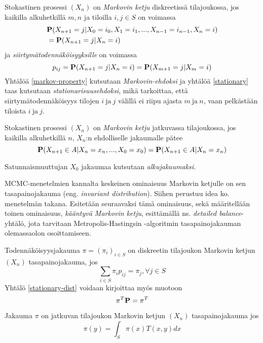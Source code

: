 \begin{maar}\label{markovin-ehto-d}
	Stokastinen prosessi $(X_n)$ on \textit{Markovin ketju} diskreetissä tilajoukossa, jos kaikilla alkuhetkillä $m,n$ ja tiloilla $i,j\in S$ on voimassa
	\begin{equation}\label{markov-property}
		\begin{split}
			&\textbf{P}(X_{n+1}=j|X_0=i_0,X_1=i_1,...,X_{n-1}=i_{n-1},X_n=i) \\
		 &= \textbf{P}(X_{n+1}=j|X_n=i) 
		\end{split}
	\end{equation}
	ja \textit{siirtymätodennäköisyyksille} on voimassa 
	\begin{equation}\label{stationary}
		p_{ij}=\textbf{P}(X_{n+1}=j|X_n=i)=\textbf{P}(X_{m+1}=j|X_m=i)
	\end{equation}
	Yhtälöä \ref{markov-property} kutsutaan \textit{Markovin-ehdoksi} ja yhtälöä \ref{stationary} taas kutsutaan \textit{stationarisuusehdoksi}, mikä tarkoittaa, 
	että siirtymätodennäköisyys tilojen $i\ \text{ja}\ j$ välillä ei riipu ajasta $m\ \text{ja}\ n$, vaan pelkästään tiloista $i\ \text{ja}\ j$.
\end{maar}

\begin{maar}\label{markov-maar-c}
	Stokastinen prosessi $(X_n)$ on \textit{Markovin ketju} jatkuvassa tilajoukossa, jos kaikilla alkuhetkillä $n$, $X_n$:n ehdolliselle jakaumalle pätee
	\begin{equation}
		\textbf{P}(X_{n+1} \in A | X_n=x_{n},...,X_0=x_0) = \textbf{P}(X_{n+1}\in A | X_n=x_{n})
	\end{equation}
\end{maar}

\begin{maar}
	Satunnaismuuttujan $X_0$ jakaumaa kutsutaan \textit{alkujakaumaksi}. 
\end{maar}

MCMC-menetelmien kannalta keskeinen ominaisuus Markovin ketjulle on sen tasapainojakauma (eng. \textit{invariant distribution}). Siihen perustuu idea ko. menetelmän takana. Esitetään seuraavaksi tämä ominaisuus, sekä määritellään toinen ominaisuus, \textit{kääntyvä Markovin ketju}, esittämällä ns. \textit{detailed balance}-yhtälö, jota tarvitaan Metropolis-Hastingsin -algoritmin tasapainojakauman olemassaolon osoittamiseen. 

\begin{maar}
	Todennäköisyysjakauma $\pi=(\pi_i)_{i\in S}$ on diskreetin tilajoukon Markovin ketjun $(X_n)$ tasapainojakauma, jos 
	\begin{equation}\label{stationary-dist}
		\sum_{i\in S} \pi_i p_{ij}=\pi_j, \forall j\in S
	\end{equation}
	Yhtälö \ref{stationary-dist} voidaan kirjoittaa myös muotoon 
	\begin{equation}\label{stationary-dist2}
		\pi^T\textbf{P}= \pi^T
	\end{equation}
	
	Jakauma $\pi$ on jatkuvan tilajoukon Markovin ketjun $( X_n )$ tasapainojakauma jos 
	\begin{equation}
		\pi(y) = \int_S \pi(x) T(x,y) dx
	\end{equation}
\end{maar}

